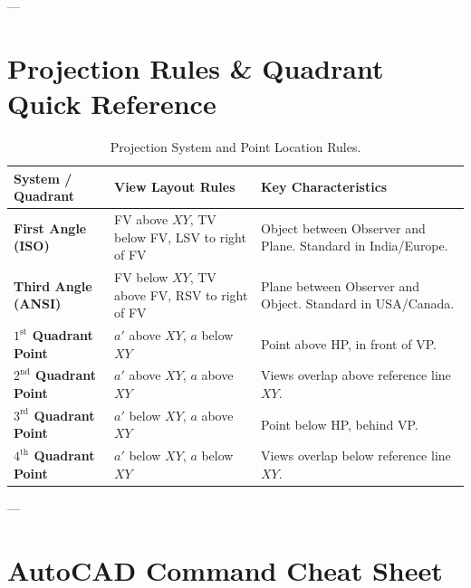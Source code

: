 ---

\section{Projection Rules \& Quadrant Quick Reference}

\begin{table}[htbp]
\centering
\small
\begin{tabularx}{\textwidth}{l p{4.5cm} X}
\toprule
\textbf{System / Quadrant} & \textbf{View Layout Rules} & \textbf{Key Characteristics} \\
\midrule
\textbf{First Angle (ISO)} & FV above $XY$, TV below FV, LSV to right of FV & Object between Observer and Plane. Standard in India/Europe. \\
\addlinespace
\textbf{Third Angle (ANSI)} & FV below $XY$, TV above FV, RSV to right of FV & Plane between Observer and Object. Standard in USA/Canada. \\
\addlinespace
\textbf{$1^{\text{st}}$ Quadrant Point} & $a'$ above $XY$, $a$ below $XY$ & Point above HP, in front of VP. \\
\addlinespace
\textbf{$2^{\text{nd}}$ Quadrant Point} & $a'$ above $XY$, $a$ above $XY$ & Views overlap above reference line $XY$. \\
\addlinespace
\textbf{$3^{\text{rd}}$ Quadrant Point} & $a'$ below $XY$, $a$ above $XY$ & Point below HP, behind VP. \\
\addlinespace
\textbf{$4^{\text{th}}$ Quadrant Point} & $a'$ below $XY$, $a$ below $XY$ & Views overlap below reference line $XY$. \\
\bottomrule
\end{tabularx}
\caption{Projection System and Point Location Rules.}
\label{tab:projection-rules-master}
\end{table}

---

\section{AutoCAD Command Cheat Sheet}


